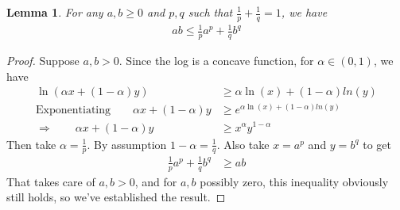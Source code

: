 \documentclass[12pt]{article}
\theoremstyle{plain}
\newtheorem{lem}[thm]{Lemma}
\theoremstyle{definition}
\theoremstyle{remark}
\begin{document}
\begin{lem}
\label{lem:holder}
For any $a,b\geq 0$ and $p,q$ such that $\frac{1}{p}+\frac{1}{q}=1$, we
have
\begin{align*}
  ab
  \leq
  \frac{1}{p} a^p + \frac{1}{q} b^q
\end{align*}
\end{lem}
\begin{proof}
Suppose $a,b>0$.  Since the log is a concave function, for
$\alpha\in(0,1)$, we have
\begin{align*}
  \ln(\alpha x + (1-\alpha)y)
  &\geq
  \alpha \ln(x) + (1-\alpha)ln(y) \\
  \text{Exponentiating} \qquad
  \alpha x + (1-\alpha)y
  &\geq
  e^{\alpha \ln(x) + (1-\alpha)ln(y)} \\
  \Rightarrow\qquad
  \alpha x + (1-\alpha)y
  &\geq
  x^\alpha y^{1-\alpha}
\end{align*}
Then take $\alpha =\frac{1}{p}$. By assumption $1-\alpha=\frac{1}{q}$.
Also take $x=a^p$ and $y=b^q$ to get
\begin{align*}
  \frac{1}{p} a^p + \frac{1}{q} b^q
  &\geq
  ab
\end{align*}
That takes care of $a,b>0$, and for $a,b$ possibly zero, this inequality
obviously still holds, so we've established the result.
\end{proof}
\end{document}
